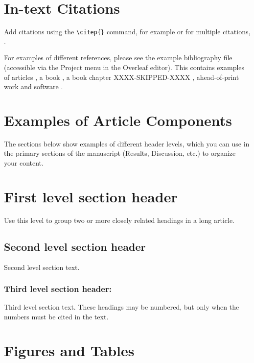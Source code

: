 \documentclass[9pt,twocolumn,twoside]{g3_article/gsag3jnl}
\begin{document}
\section*{In-text Citations}

Add citations using the \verb|\citep{}| command, for example \citep{neher2013genealogies} or for multiple citations, \citep{neher2013genealogies, rodelsperger2014characterization}.

For examples of different references, please see the example bibliography file 
(accessible via the Project menu in the Overleaf editor). This contains examples 
of articles \citep{neher2013genealogies, rodelsperger2014characterization}, a 
book \citep{Sturtevent2001}, a book 
chapter 
XXXX-SKIPPED-XXXX
, ahead-of-print work \citep{Starita2015} and software \citep{Kruijer2015}.

\section*{Examples of Article Components}
\label{sec:examples}

The sections below show examples of different header levels, which you can use in the primary sections of the manuscript (Results, Discussion, etc.) to organize your content.

\section*{First level section header}

Use this level to group two or more closely related headings in a long article.

\subsection*{Second level section header}

Second level section text.

\subsubsection*{Third level section header:}

Third level section text. These headings may be numbered, but only when the numbers must be cited in the text. 

\section*{Figures and Tables}
\end{document}
